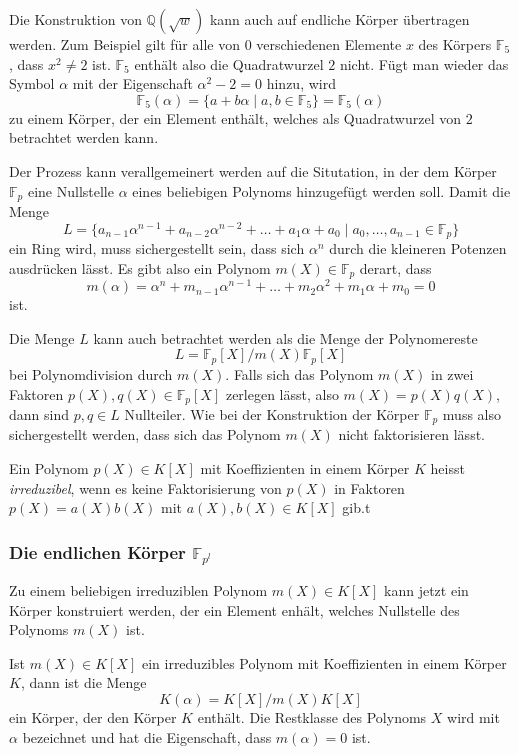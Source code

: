 Die Konstruktion von $\mathbb{Q}(\!\sqrt{w})$ kann auch auf endliche
Körper übertragen werden.
Zum Beispiel gilt für alle von $0$ verschiedenen Elemente $x$ des Körpers
$\mathbb{F}_5$, dass $x^2\ne 2$ ist.
$\mathbb{F}_5$ enthält also die Quadratwurzel $2$ nicht.
Fügt man wieder das Symbol $\alpha$ mit der Eigenschaft $\alpha^2-2=0$
hinzu, wird
\[
\mathbb{F}_5(\alpha)
=
\{
a+b\alpha
\mid
a,b\in\mathbb{F}_5
\}
=
\mathbb{F}_5(\alpha)
\]
zu einem Körper, der ein Element enthält, welches als Quadratwurzel von
$2$ betrachtet werden kann.

Der Prozess kann verallgemeinert werden auf die Situtation,
in der dem Körper $\mathbb{F}_p$ eine Nullstelle $\alpha$ eines beliebigen
Polynoms hinzugefügt werden soll.
Damit die Menge
\[
L
=
\{
a_{n-1}\alpha^{n-1} + a_{n-2}\alpha^{n-2} + \dots + a_1\alpha + a_0
\mid
a_0,\dots,a_{n-1}\in\mathbb{F}_p
\}
\]
ein Ring wird, muss sichergestellt sein, dass sich $\alpha^n$ durch
die kleineren Potenzen ausdrücken lässt.
Es gibt also ein Polynom $m(X)\in\mathbb{F}_p$ derart, dass
\[
m(\alpha)
=
\alpha^n + m_{n-1}\alpha^{n-1} + \dots + m_2\alpha^2 + m_1\alpha + m_0
=
0
\]
ist.

Die Menge $L$ kann auch betrachtet werden als die Menge der Polynomereste
\[
L
=
\mathbb{F}_p[X] / m(X)\mathbb{F}_p[X]
\]
bei Polynomdivision durch $m(X)$.
Falls sich das Polynom $m(X)$ in zwei Faktoren $p(X),q(X)\in\mathbb{F}_p[X]$
zerlegen lässt, also $m(X)=p(X)q(X)$, dann sind $p,q\in L$ Nullteiler.
Wie bei der Konstruktion der Körper $\mathbb{F}_p$ muss also sichergestellt
werden, dass sich das Polynom $m(X)$ nicht faktorisieren lässt.

\begin{definition}
Ein Polynom $p(X)\in K[X]$ mit Koeffizienten in einem Körper $K$ heisst
{\em ir\-re\-du\-zi\-bel}, wenn es keine Faktorisierung von $p(X)$ in Faktoren
%
$p(X)=a(X)b(X)$ mit $a(X),b(X)\in K[X]$ gib.t
\end{definition}

%
%
\subsubsection{Die endlichen Körper $\mathbb{F}_{p^l}$}
Zu einem beliebigen irreduziblen Polynom $m(X)\in K[X]$ kann jetzt
ein Körper konstruiert werden, der ein Element enhält, welches Nullstelle
des Polynoms $m(X)$ ist.

\begin{satz}
Ist $m(X)\in K[X]$ ein irreduzibles Polynom mit Koeffizienten in einem
Körper $K$, dann ist die Menge
\[
K(\alpha)
=
K[X] / m(X) K[X]
\]
ein Körper, der den Körper $K$ enthält.
Die Restklasse des Polynoms $X$ wird mit $\alpha$ bezeichnet und hat
die Eigenschaft, dass $m(\alpha)=0$ ist.
\end{satz}

